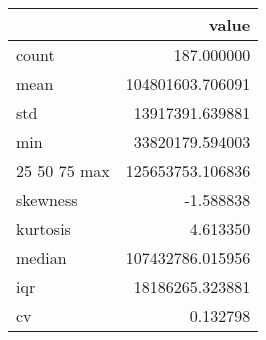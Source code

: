 \begin{tabular}{lr}
\toprule
 & value \\
\midrule
count & 187.000000 \\
mean & 104801603.706091 \\
std & 13917391.639881 \\
min & 33820179.594003 \\
25%
50%
75%
max & 125653753.106836 \\
skewness & -1.588838 \\
kurtosis & 4.613350 \\
median & 107432786.015956 \\
iqr & 18186265.323881 \\
cv & 0.132798 \\
\bottomrule
\end{tabular}
